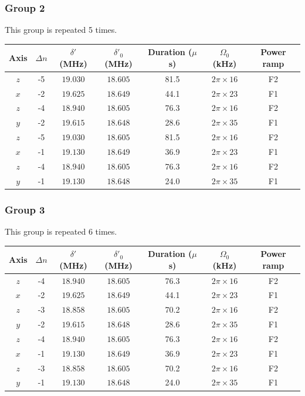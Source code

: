 \documentclass[aps,secnumarabic,amsmath,amssymb]{revtex4}
\begin{document}
\subsubsection{Group 2}
This group is repeated 5 times.
\begin{center}
  \begin{tabular}{|c|c|c|c|c|c|c|}
    \hline
    Axis&$\Delta n$&$\delta'$ (MHz)&$\delta'_0$ (MHz)&Duration ($\mu$s)& $\Omega_0$ (kHz)&Power ramp\\\hline
    $z$&-5&$19.030$&$18.605$&81.5&$2\pi\times16$&F2\\\hline
    $x$&-2&$19.625$&$18.649$&44.1&$2\pi\times23$&F1\\\hline
    $z$&-4&$18.940$&$18.605$&76.3&$2\pi\times16$&F2\\\hline
    $y$&-2&$19.615$&$18.648$&28.6&$2\pi\times35$&F1\\\hline
    $z$&-5&$19.030$&$18.605$&81.5&$2\pi\times16$&F2\\\hline
    $x$&-1&$19.130$&$18.649$&36.9&$2\pi\times23$&F1\\\hline
    $z$&-4&$18.940$&$18.605$&76.3&$2\pi\times16$&F2\\\hline
    $y$&-1&$19.130$&$18.648$&24.0&$2\pi\times35$&F1\\\hline
  \end{tabular}
\end{center}
\subsubsection{Group 3}
This group is repeated 6 times.
\begin{center}
  \begin{tabular}{|c|c|c|c|c|c|c|}
    \hline
    Axis&$\Delta n$&$\delta'$ (MHz)&$\delta'_0$ (MHz)&Duration ($\mu$s)& $\Omega_0$ (kHz)&Power ramp\\\hline
    $z$&-4&$18.940$&$18.605$&76.3&$2\pi\times16$&F2\\\hline
    $x$&-2&$19.625$&$18.649$&44.1&$2\pi\times23$&F1\\\hline
    $z$&-3&$18.858$&$18.605$&70.2&$2\pi\times16$&F2\\\hline
    $y$&-2&$19.615$&$18.648$&28.6&$2\pi\times35$&F1\\\hline
    $z$&-4&$18.940$&$18.605$&76.3&$2\pi\times16$&F2\\\hline
    $x$&-1&$19.130$&$18.649$&36.9&$2\pi\times23$&F1\\\hline
    $z$&-3&$18.858$&$18.605$&70.2&$2\pi\times16$&F2\\\hline
    $y$&-1&$19.130$&$18.648$&24.0&$2\pi\times35$&F1\\\hline
  \end{tabular}
\end{center}
\end{document}
